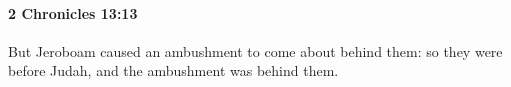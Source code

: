 
		\paragraph{2 Chronicles 13:13} %
			\label{2CHRONICLES-13-13}

			But Jeroboam caused an ambushment to come about behind them: so they were before Judah, and the ambushment was behind them.


